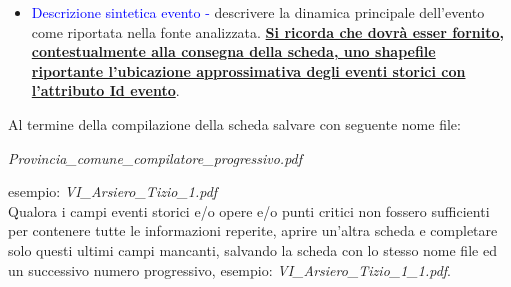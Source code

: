 \documentclass[12pt,a4paper]{article}
\begin{document}
\begin{flushleft}
\begin{itemize}
\item{\textcolor{blue}{Descrizione sintetica evento - }} descrivere la dinamica principale dell'evento come riportata nella fonte analizzata.
\vskip 5mm
\textbf{\uline{Si ricorda che dovrà esser fornito, contestualmente alla consegna della scheda, uno shapefile riportante l'ubicazione approssimativa degli eventi storici con l'attributo Id evento}}.
\end{itemize}



\vskip 1.0cm
Al termine della compilazione della scheda salvare con seguente nome file: \begin{center}\textit{Provincia\_comune\_compilatore\_progressivo.pdf}
\end{center}
esempio: \textit{VI\_Arsiero\_Tizio\_1.pdf}\\
Qualora i campi eventi storici e/o opere e/o punti critici non fossero sufficienti per contenere tutte le informazioni reperite, aprire un'altra scheda e completare solo questi ultimi campi mancanti, salvando la scheda con lo stesso nome file ed un successivo numero progressivo, esempio: \textit{VI\_Arsiero\_Tizio\_1\_1.pdf}.


\end{flushleft}
\end{document}
